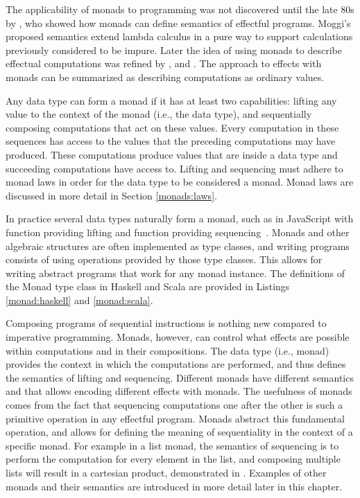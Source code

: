 



The applicability of monads to programming was not discovered until the late 80s by \textcite{comp-lambda-monads}, who showed how monads can define semantics of effectful programs. Moggi's proposed semantics extend lambda calculus in a pure way to support calculations previously considered to be impure. Later the idea of using monads to describe effectual computations was refined by \textcite{comprehending-monads}, \textcite{notions-computations} and \textcite{monads-for-fp}. The approach to effects with monads can be summarized as describing computations as ordinary values.

Any data type can form a monad if it has at least two capabilities: lifting any value to the context of the monad (i.e., the data type), and sequentially composing computations that act on these values. Every computation in these sequences has access to the values that the preceding computations may have produced. These computations produce values that are inside a data type and succeeding computations have access to. Lifting and sequencing must adhere to monad laws in order for the data type to be considered a monad. Monad laws are discussed in more detail in Section \ref{monads:laws}.

In practice several data types naturally form a monad, such as  in JavaScript with  function providing lifting and  function providing sequencing~\cite{js-array}. Monads and other algebraic structures are often implemented as type classes, and writing programs consists of using operations provided by those type classes. This allows for writing abstract programs that work for any monad instance. The definitions of the Monad type class in Haskell and Scala are provided in Listings \ref{monad:haskell} and \ref{monad:scala}.





Composing programs of sequential instructions is nothing new compared to imperative programming. Monads, however, can control what effects are possible within computations and in their compositions. The data type (i.e., monad) provides the context in which the computations are performed, and thus defines the semantics of lifting and sequencing. Different monads have different semantics and that allows encoding different effects with monads. The usefulness of monads comes from the fact that sequencing computations one after the other is such a primitive operation in any effectful program. Monads abstract this fundamental operation, and allows for defining the meaning of sequentiality in the context of a specific monad. For example in a list monad, the semantics of sequencing is to perform the computation for every element in the list, and composing multiple lists will result in a cartesian product, demonstrated in . Examples of other monads and their semantics are introduced in more detail later in this chapter.

